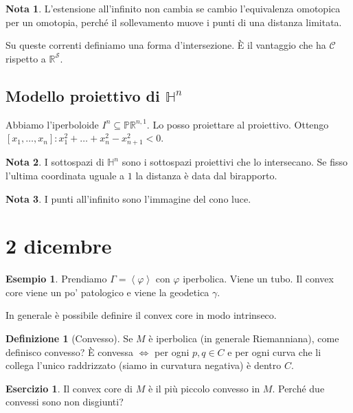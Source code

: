 \documentclass[a4paper]{article}
\theoremstyle{definition}
\newtheorem{definition}{Definizione}
\newtheorem{exercise}{Esercizio}
\newtheorem{example}{Esempio}
\newtheorem{remark}{Nota}
\begin{document}
    \begin{remark}
        L'estensione all'infinito non cambia se cambio l'equivalenza omotopica per un omotopia, perché il sollevamento muove i punti di una distanza limitata.
    \end{remark}
    
    Su queste correnti definiamo una forma d'intersezione. È il vantaggio che ha $\mathcal C$ rispetto a $\mathbb R^{\mathcal S}$.

\subsection{Modello proiettivo di $\mathbb H^n$}

    Abbiamo l'iperboloide $I^{n} \subseteq \mathbb{PR}^{n,1}$. Lo posso proiettare al proiettivo. Ottengo $[x_1, \ldots, x_n] : x_1^2 + \ldots + x_n^2 - x_{n+1}^2 < 0$.
    \begin{remark}
        I sottospazi di $\mathbb H^n$ sono i sottospazi proiettivi che lo intersecano. Se fisso l'ultima coordinata uguale a $1$ la distanza è data dal birapporto.
    \end{remark}

    \begin{remark}
        I punti all'infinito sono l'immagine del cono luce.
    \end{remark}

\section{2 dicembre}
    
    \begin{example}
        Prendiamo $\Gamma = \left<\varphi\right>$ con $\varphi$ iperbolica. Viene un tubo. Il convex core viene un po' patologico e viene la geodetica $\gamma$.
    \end{example}
    
    In generale è possibile definire il convex core in modo intrinseco.

    \begin{definition}[Convesso]
        Se $M$ è iperbolica (in generale Riemanniana), come definisco convesso? È convessa $\iff$ per ogni $p,q \in C$ e per ogni curva che li collega l'unico raddrizzato (siamo in curvatura negativa) è dentro $C$.
    \end{definition}

    \begin{exercise}
        Il convex core di $M$ è il più piccolo convesso in $M$. Perché due convessi sono non disgiunti?
    \end{exercise}
\end{document}
